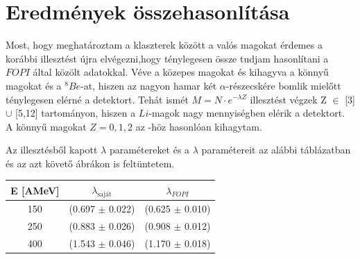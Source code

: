 \documentclass[a4paper,12pt]{article}
\begin{document}
\section{ Eredmények összehasonlítása}

\vspace{5mm}

\par Most, hogy meghatároztam a klaszterek között a valós magokat érdemes a korábbi illesztést újra elvégezni,hogy ténylegesen össze tudjam hasonlítani a $FOPI$ által közölt adatokkal. Véve a közepes magokat és kihagyva a könnyű magokat és a $^{8}Be$-at, hiszen az nagyon hamar két $\alpha$-részecskére bomlik mielőtt ténylegesen elérné a detektort. Tehát ismét $M = N\cdot e^{-\lambda Z}$ illesztést végzek Z $\in$ [3] $\cup$ [5,12] tartományon, hiszen a $Li$-magok nagy mennyiségben elérik a detektort. A könnyű magokat $Z = 0, 1, 2$ az \cite{REISDORF1997493}-höz hasonlóan kihagytam. 

\vspace{5mm}

\par Az illesztésből kapott $\lambda$ paramétereket és a \cite{REISDORF1997493} $\lambda$ paramétereit az alábbi táblázatban és az azt követő ábrákon is feltüntetem.

\vspace{5mm}

\begin{center}
\begin{tabular}{|c|c|c|}
\hline
E [AMeV] & $\lambda_{\text{saját}}$ & $\lambda_{FOPI}$ \\
\hline
150 & (0.697 $\pm$ 0.022) & (0.625 $\pm$ 0.010)\\
\hline
250  & (0.883 $\pm$ 0.026) & (0.908 $\pm$ 0.012)\\
\hline
400 & (1.543 $\pm$ 0.046) & (1.170 $\pm$ 0.018) \\
\hline
\end{tabular}
\end{center}

\vspace{5mm}
\end{document}
